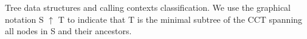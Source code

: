 \label{fig:hcct-venn} Tree data structures and calling contexts classification. We use the graphical notation S $\uparrow$ T to indicate that T is the minimal subtree of the CCT spanning all nodes in S and their ancestors.
